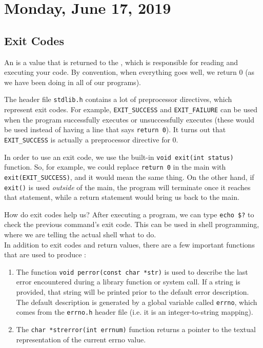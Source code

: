 \section{Monday, June 17, 2019}

\subsection{Exit Codes} 
An  is a value that is returned to the , which is responsible for reading and executing your code. By convention, when everything goes well, we return $0$ (as we have been doing in all of our programs). 

The header file \verb!stdlib.h! contains a lot of preprocessor directives, which represent exit codes. For example, \verb!EXIT_SUCCESS! and \verb!EXIT_FAILURE! can be used when the program successfully executes or unsuccessfully executes (these would be used instead of having a line that says \verb!return 0!). It turns out that \verb!EXIT_SUCCESS! is actually a preprocessor directive for $0$. 


In order to use an exit code, we use the built-in \verb!void exit(int status)! function. So, for example, we could replace \verb!return 0! in the main with \verb!exit(EXIT_SUCCESS)!, and it would mean the same thing. On the other hand, if \verb!exit()! is used \textit{outside} of the main, the program will terminate once it reaches that statement, while a return statement would bring us back to the main. 

How do exit codes help us? After executing a program, we can type \verb!echo $?! to check the previous command's exit code. This can be used in shell programming, where we are telling the actual shell what to do. \\


In addition to exit codes and return values, there are a few important functions that are used to produce : 

\begin{enumerate}
    \item The function \texttt{void perror(const char *str)} is used to describe the last error encountered during a library function or system call. If a string is provided, that string will be printed prior to the default error description. The default description is generated by a global variable called \verb!errno!, which comes from the \verb!errno.h! header file (i.e. it is an integer-to-string mapping).
    \item The \verb!char *strerror(int errnum)! function returns a pointer to the textual representation of the current errno value. 
\end{enumerate}

